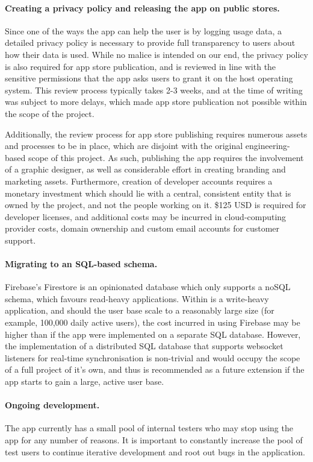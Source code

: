 \paragraph{Creating a privacy policy and releasing the app on public stores.} Since one of the ways the app can help the user is by logging usage data, a detailed privacy policy is necessary to provide full transparency to users about how their data is used. While no malice is intended on our end, the privacy policy is also required for app store publication, and is reviewed in line with the sensitive permissions that the app asks users to grant it on the host operating system. This review process typically takes 2-3 weeks, and at the time of writing was subject to more delays, which made app store publication not possible within the scope of the project.

Additionally, the review process for app store publishing requires numerous assets and processes to be in place, which are disjoint with the original engineering-based scope of this project. As such, publishing the app requires the involvement of a graphic designer, as well as considerable effort in creating branding and marketing assets. Furthermore, creation of developer accounts requires a monetary investment which should lie with a central, consistent entity that is owned by the project, and not the people working on it. \$125 USD is required for developer licenses, and additional costs may be incurred in cloud-computing provider costs, domain ownership and custom email accounts for customer support.

\paragraph{Migrating to an SQL-based schema.} Firebase's Firestore is an opinionated database which only supports a noSQL schema, which favours read-heavy applications. Within is a write-heavy application, and should the user base scale to a reasonably large size (for example, 100,000 daily active users), the cost incurred in using Firebase may be higher than if the app were implemented on a separate SQL database. However, the implementation of a distributed SQL database that supports websocket listeners for real-time synchronisation is non-trivial and would occupy the scope of a full project of it's own, and thus is recommended as a future extension if the app starts to gain a large, active user base.

\paragraph{Ongoing development. } The app currently has a small pool of internal testers who may stop using the app for any number of reasons. It is important to constantly increase the pool of test users to continue iterative development and root out bugs in the application.

